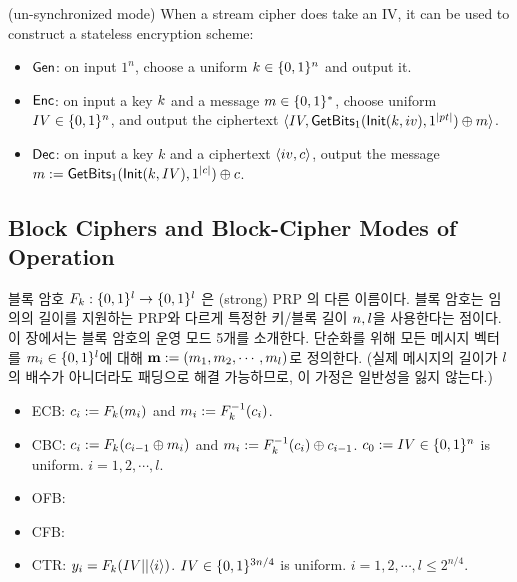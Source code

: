 (un-synchronized mode) When a stream cipher does take an IV, it can be used to
construct a stateless encryption scheme:
\begin{itemize}
  \item $\textsf{Gen}$: on input $1^n$, choose a uniform $k \in \{0, 1\}^{n}$ and
        output it.
  \item $\textsf{Enc}$: on input a key $k$ and a message $m \in \{0, 1\}^{*}$,
        choose uniform $IV \in \{0, 1\}^{n}$, and output the ciphertext
        $\langle IV, \textsf{GetBits}_1(\textsf{Init}(k, iv), 1^{|pt|}) \oplus m \rangle$.

  \item $\textsf{Dec}$: on input a key $k$ and a ciphertext $\langle iv, c \rangle$, output
        the message
        $m := \textsf{GetBits}_1(\textsf{Init}(k, IV), 1^{|c|}) \oplus c$.
\end{itemize}

\newpage

\subsection*{Block Ciphers and Block-Cipher Modes of Operation}
블록 암호 $F_k: \{0, 1\}^{l} \to \{0, 1\}^{l}$ 은 (strong) PRP 의 다른 이름이다.
블록 암호는 임의의 길이를 지원하는 PRP와 다르게 특정한 키/블록 길이 $n, l$을 사용한다는
점이다. 이 장에서는 블록 암호의 운영 모드 5개를 소개한다. 단순화를 위해 모든 메시지 벡터를
$m_i \in \{0, 1\}^{l}$에 대해 $\mathbf{m} := (m_1, m_2, \cdots, m_l)$로
정의한다. (실제 메시지의 길이가 $l$의 배수가 아니더라도 패딩으로 해결 가능하므로, 이 가정은
일반성을 잃지 않는다.)

\begin{itemize}
  \item ECB: $c_i := F_k(m_i)$ and $m_i := F^{-1}_k(c_i)$.
  \item CBC: $c_i := F_k(c_{i-1} \oplus m_i)$ and
        $m_i := F^{-1}_k(c_i) \oplus c_{i-1}$.
        $c_0 := IV \in \{0, 1\}^{n}$ is uniform. $i = 1,2, \cdots, l$.
  \item OFB:
  \item CFB:
  \item CTR: $y_i = F_k(IV || \langle i \rangle)$. $IV \in \{0, 1\}^{3n/4}$ is uniform.
        $i = 1, 2, \cdots, l \le 2^{n/4}$.
\end{itemize}

\newline


